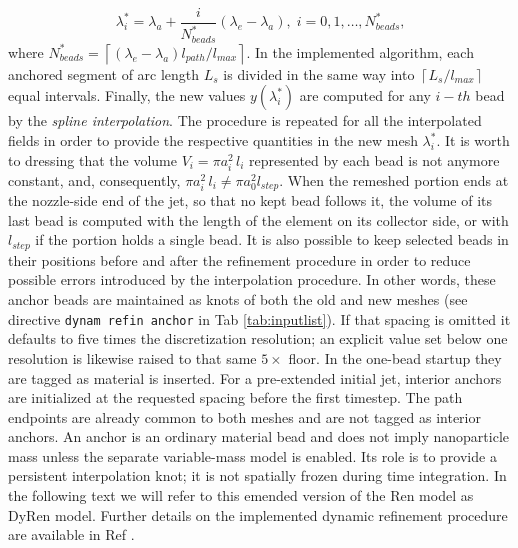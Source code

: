 \begin{equation}
\lambda_{i}^{*}=\lambda_{a}+\frac{i}{N_{beads}^{*}}\left(\lambda_{e}-\lambda_{a}\right),\;i=0,1,\ldots,N_{beads}^{*}\text{,}
\end{equation}
where $N_{beads}^{*}=\left\lceil \left(\lambda_{e}-\lambda_{a}\right)l_{path}/l_{max}\right\rceil$.
In the implemented algorithm, each anchored segment of
arc length $L_s$ is divided in the same way into $\left\lceil L_s/l_{max}\right\rceil$
equal intervals.
Finally, the new values $y\left(\lambda_{i}^{*}\right)$
are computed for any $i-th$ bead by the \textit{spline interpolation}.
The procedure is repeated for all the interpolated fields
in order to provide the respective quantities
in the new mesh ${\lambda_{i}^{*}}$. It is worth to dressing that
the volume $V_{i}=\pi a_{i}^{2}\,l_{i}$ represented by each bead
is not anymore constant, and, consequently, $\pi a_{i}^{2}\,l_{i}\neq\pi a_{0}^{2}l_{step}$.
When the remeshed portion ends at the nozzle-side end of the jet, so that
no kept bead follows it, the volume of its last bead is computed with the
length of the element on its collector side, or with $l_{step}$ if the
portion holds a single bead.
It is also possible to keep selected beads in their positions before and after
the refinement procedure in order to reduce possible errors introduced
by the interpolation procedure. In other words, these anchor beads
are maintained as knots of both the old and new meshes (see directive
\texttt{dynam refin anchor} in Tab \ref{tab:inputlist}). If that spacing is
omitted it defaults to five times the discretization resolution; an
explicit value set below one resolution is likewise raised to that same
$5\times$ floor. In the
one-bead startup they are tagged as material is inserted. For a pre-extended
initial jet, interior anchors are initialized at the requested spacing before
the first timestep. The path endpoints are already common to both meshes and
are not tagged as interior anchors. An anchor is an ordinary material bead and
does not imply nanoparticle mass unless the separate variable-mass model is
enabled. Its role is to provide a persistent interpolation knot; it is not
spatially frozen during time integration. In the following text we will refer
to this emended version of the Ren model
as DyRen model. Further details on the implemented dynamic refinement
procedure are available in Ref \cite{lauricella2016refinement}.

